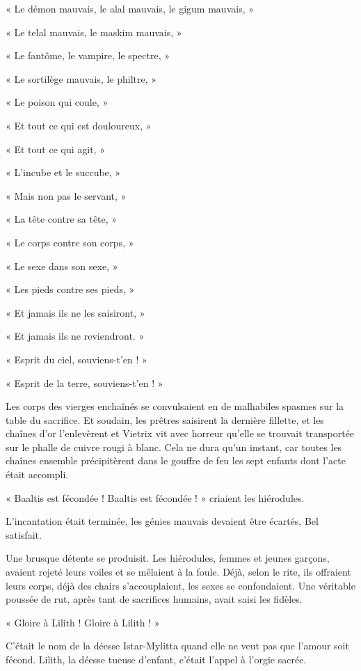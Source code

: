 \documentclass[a4paper, 11pt, oneside, polutonikogreek, french]{article}
\begin{document}
« Le démon mauvais, le alal mauvais, le gigum mauvais, »

« Le telal mauvais, le maskim mauvais, »

« Le fantôme, le vampire, le spectre, »

« Le sortilège mauvais, le philtre, »

« Le poison qui coule, »

« Et tout ce qui est douloureux, »

« Et tout ce qui agit, »

« L'incube et le succube, »

« Mais non pas le servant, »

« La tête contre sa tête, »

« Le corps contre son corps, »

« Le sexe dans son sexe, »

« Les pieds contre ses pieds, »

« Et jamais ils ne les saisiront, »

« Et jamais ils ne reviendront. »

« Esprit du ciel, souviens-t'en ! »

« Esprit de la terre, souviens-t'en ! »

Les corps des vierges enchaînés se convulsaient en de malhabiles spasmes sur la table du sacrifice. Et soudain, les prêtres saisirent la dernière fillette, et les chaînes d'or l'enlevèrent et Vietrix vit avec horreur qu'elle se trouvait transportée sur le phalle de cuivre rougi à blanc. Cela ne dura qu'un instant, car toutes les chaînes ensemble précipitèrent dans le gouffre de feu les sept enfants dont l'acte était accompli.

« Baaltis est fécondée ! Baaltis est fécondée ! » criaient les hiérodules.

\bigskip
\centerline{\EightStarTaper}
\centerline{\EightStarTaper\EightStarTaper}
\bigskip

L'incantation était terminée, les génies mauvais devaient être écartés, Bel satisfait.

Une brusque détente se produisit. Les hiérodules, femmes et jeunes garçons, avaient rejeté leurs voiles et se mêlaient à la foule. Déjà, selon le rite, ils offraient leurs corps, déjà des chairs s'accouplaient, les sexes se confondaient. Une véritable poussée de rut, après tant de sacrifices humains, avait saisi les fidèles.

« Gloire à Lilith ! Gloire à Lilith ! »

C'était le nom de la déesse Istar-Mylitta quand elle ne veut pas que l'amour soit fécond. Lilith, la déesse tueuse d'enfant, c'était l'appel à l'orgie sacrée.
\end{document}
